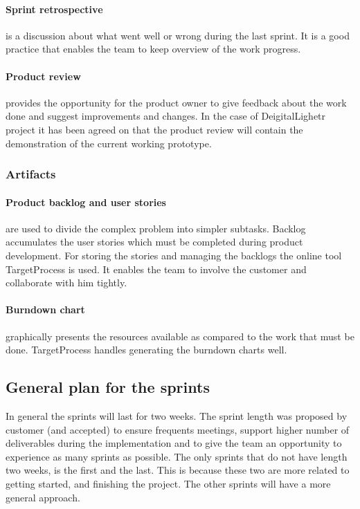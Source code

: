 \paragraph{Sprint retrospective} is a discussion about what went well or wrong during the last sprint. It is a good practice that enables the team to keep overview of the work progress.

\paragraph{Product review} provides the opportunity for the product owner to give feedback about the work done and suggest improvements and changes. In the case of DeigitalLighetr project it has been agreed on that the product review will contain the demonstration of the current working prototype.

\subsubsection{Artifacts}

\paragraph{Product backlog and user stories} are used to divide the complex problem into simpler subtasks. Backlog accumulates the user stories which must be completed during product development. For storing the stories and managing the backlogs the online tool TargetProcess is used. It enables the team to involve the customer and collaborate with him tightly.

\paragraph{Burndown chart} graphically presents the resources available as compared to the work that must be done. TargetProcess handles generating the burndown charts well.


\subsection{General plan for the sprints}
In general the sprints will last for two weeks. The sprint length was proposed by customer (and accepted) to ensure frequents meetings, support higher number of deliverables during the implementation and to give the team an opportunity to experience as many sprints as possible. The only sprints that do not have length two weeks, is the first and the last. This is because these two are more related to getting started, and finishing the project. The other sprints will have a more general approach. 

